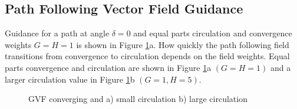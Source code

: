 \documentclass[numbered,pdftex]{ohio-etd}
\begin{document}
\subsection{Path Following Vector Field Guidance}

Guidance for a path at angle $\delta = 0$ and equal parts circulation and convergence weights $G=H=1$ is shown in Figure \ref{fig:GVFLine}a. How quickly the path following field transitions from convergence to circulation depends on the field weights. Equal parts convergence and circulation are shown in Figure \ref{fig:GVFLine}a $(G=H=1)$ and a larger circulation value in Figure \ref{fig:GVFLine}b $(G=1, H=5)$. \\


\begin{figure}[H]
	\begin{subfigmatrix}{2}%
		\centering	
		
		\hspace*{0mm}
	\end{subfigmatrix}
	\caption{GVF converging and a) small circulation b) large circulation}
	\label{fig:GVFLine}
\end{figure} 
\end{document}
